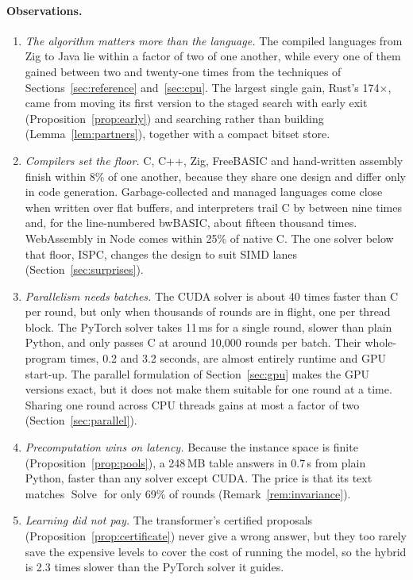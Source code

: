 \documentclass[11pt,a4paper]{article}
\theoremstyle{definition}
\theoremstyle{remark}
\begin{document}
\paragraph{Observations.}
\begin{enumerate}[label=(\arabic*)]
\item \emph{The algorithm matters more than the language.} The compiled languages from Zig to Java lie within a
factor of two of one another, while every one of them gained between two and twenty-one times from the
techniques of Sections~\ref{sec:reference} and~\ref{sec:cpu}. The largest single gain, Rust's
174$\times$, came from moving its first version to the staged search with early exit
(Proposition~\ref{prop:early}) and searching rather than building (Lemma~\ref{lem:partners}), together with a compact bitset store.
\item \emph{Compilers set the floor.} C, C++, Zig, FreeBASIC and hand-written assembly finish within 8\% of one another,
because they share one design and differ only in code generation. Garbage-collected and managed languages
come close when written over flat buffers, and interpreters trail C by between nine times and, for the line-numbered bwBASIC, about fifteen thousand times. WebAssembly in Node comes within 25\% of native C. The one solver below that floor, ISPC, changes the design to suit SIMD lanes (Section~\ref{sec:surprises}).
\item \emph{Parallelism needs batches.} The CUDA solver is about 40 times faster than C per round, but only
when thousands of rounds are in flight, one per thread block. The PyTorch solver takes 11\,ms for a single
round, slower than plain Python, and only passes C at around 10{,}000 rounds per batch. Their whole-program
times, 0.2 and 3.2 seconds, are almost entirely runtime and GPU start-up. The parallel formulation of
Section~\ref{sec:gpu} makes the GPU versions exact, but it does not make them suitable for one round at a time. Sharing one round across CPU threads gains at most a factor of two (Section~\ref{sec:parallel}).
\item \emph{Precomputation wins on latency.} Because the instance space is finite
(Proposition~\ref{prop:pools}), a 248\,MB table answers in 0.7\,\textmu s from plain Python, faster than any
solver except CUDA. The price is that its text matches $\operatorname{Solve}$ for only 69\% of rounds
(Remark~\ref{rem:invariance}).
\item \emph{Learning did not pay.} The transformer's certified proposals (Proposition~\ref{prop:certificate})
never give a wrong answer, but they too rarely save the expensive levels to cover the cost of running the
model, so the hybrid is 2.3 times slower than the PyTorch solver it guides.
\end{enumerate}
\end{document}
